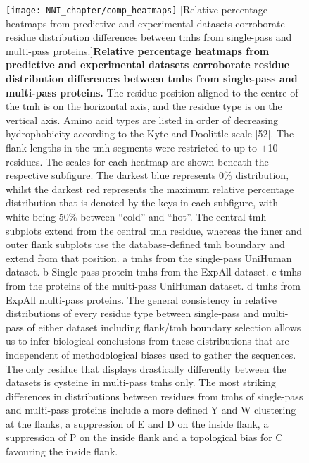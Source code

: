 \begin{figure}[p]
\centering
\texttt{[image: NNI\_chapter/comp\_heatmaps]}
[Relative percentage heatmaps from predictive and experimental datasets corroborate residue distribution differences between \gls{tmh}s from single-pass and multi-pass proteins.]{\textbf{Relative percentage heatmaps from predictive and experimental datasets corroborate residue distribution differences between \gls{tmh}s from single-pass and multi-pass proteins.}
The residue position aligned to the centre of the \gls{tmh} is on the horizontal axis, and the residue type is on the vertical axis. Amino acid types are listed in order of decreasing hydrophobicity according to the Kyte and Doolittle scale [52]. The flank lengths in the \gls{tmh} segments were restricted to up to $\pm$10 residues. The scales for each heatmap are shown beneath the respective subfigure. The darkest blue represents 0\% distribution, whilst the darkest red represents the maximum relative percentage distribution that is denoted by the keys in each subfigure, with white being 50\% between ``cold'' and ``hot''. The central \gls{tmh} subplots extend from the central \gls{tmh} residue, whereas the inner and outer flank subplots use the database-defined \gls{tmh} boundary and extend from that position. a \gls{tmh}s from the single-pass UniHuman dataset. b Single-pass protein \gls{tmh}s from the ExpAll dataset. c \gls{tmh}s from the proteins of the multi-pass UniHuman dataset. d \gls{tmh}s from ExpAll multi-pass proteins. The general consistency in relative distributions of every residue type between single-pass and multi-pass of either dataset including flank/\gls{tmh} boundary selection allows us to infer biological conclusions from these distributions that are independent of methodological biases used to gather the sequences. The only residue that displays drastically differently between the datasets is cysteine in multi-pass \gls{tmh}s only. The most striking differences in distributions between residues from \gls{tmh}s of single-pass and multi-pass proteins include a more defined Y and W clustering at the flanks, a suppression of E and D on the inside flank, a suppression of P on the inside flank and a topological bias for C favouring the inside flank.}

\label{fig:comp_heatmaps}
\end{figure}

